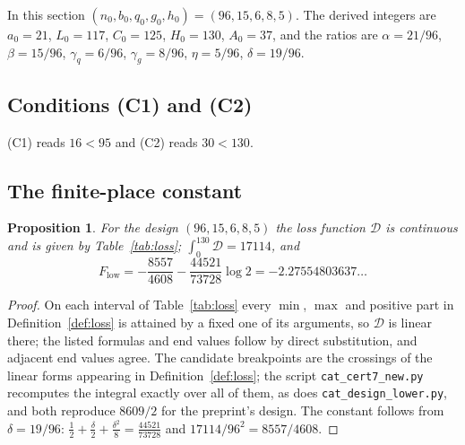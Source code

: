 \documentclass[11pt]{article}
\newtheorem{proposition}[theorem]{Proposition}
\theoremstyle{definition}
\newcommand{\Dl}{\mathcal{D}}
\begin{document}
In this section $(n_0,b_0,q_0,g_0,h_0)=(96,15,6,8,5)$. The derived integers are $a_0=21$, $L_0=117$, $C_0=125$, $H_0=130$, $A_0=37$, and the ratios are $\alpha=21/96$, $\beta=15/96$, $\gamma_q=6/96$, $\gamma_g=8/96$, $\eta=5/96$, $\delta=19/96$.

\subsection{Conditions (C1) and (C2)}
(C1) reads $16<95$ and (C2) reads $30<130$.

\subsection{The finite-place constant}

\begin{proposition}\label{prop:flow96}
For the design $(96,15,6,8,5)$ the loss function $\Dl$ is continuous and is given by Table~\ref{tab:loss}; $\int_0^{130}\Dl=17114$, and
\[
F_{\mathrm{low}}=-\frac{8557}{4608}-\frac{44521}{73728}\log2=-2.27554803637\ldots
\]
\end{proposition}

\begin{proof}
On each interval of Table~\ref{tab:loss} every $\min$, $\max$ and positive part in Definition~\ref{def:loss} is attained by a fixed one of its arguments, so $\Dl$ is linear there; the listed formulas and end values follow by direct substitution, and adjacent end values agree. The candidate breakpoints are the crossings of the linear forms appearing in Definition~\ref{def:loss}; the script \texttt{cat\_cert7\_new.py} recomputes the integral exactly over all of them, as does \texttt{cat\_design\_lower.py}, and both reproduce $8609/2$ for the preprint's design. The constant follows from $\delta=19/96$: $\frac12+\frac\delta2+\frac{\delta^2}8=\frac{44521}{73728}$ and $17114/96^2=8557/4608$.
\end{proof}
\end{document}
